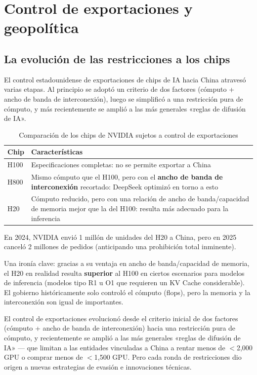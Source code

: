 \section{Control de exportaciones y geopolítica}

\subsection{La evolución de las restricciones a los chips}

El control estadounidense de exportaciones de chips de IA hacia China atravesó varias etapas. Al principio se adoptó un criterio de dos factores (cómputo + ancho de banda de interconexión), luego se simplificó a una restricción pura de cómputo, y más recientemente se amplió a las más generales «reglas de difusión de IA».

\begin{table}[H]
\centering
\begin{tabular}{lp{8cm}}
\toprule
\textbf{Chip} & \textbf{Características} \\
\midrule
H100 & Especificaciones completas: no se permite exportar a China \\
H800 & Mismo cómputo que el H100, pero con el \textbf{ancho de banda de interconexión} recortado: DeepSeek optimizó en torno a esto \\
H20 & Cómputo reducido, pero con una relación de ancho de banda/capacidad de memoria mejor que la del H100: resulta más adecuado para la inferencia \\
\bottomrule
\end{tabular}
\caption{Comparación de los chips de NVIDIA sujetos a control de exportaciones}
\end{table}

En 2024, NVIDIA envió 1 millón de unidades del H20 a China, pero en 2025 canceló 2 millones de pedidos (anticipando una prohibición total inminente).

Una ironía clave: gracias a su ventaja en ancho de banda/capacidad de memoria, el H20 en realidad resulta \textbf{superior} al H100 en ciertos escenarios para modelos de inferencia (modelos tipo R1 u O1 que requieren un KV Cache considerable). El gobierno históricamente solo controló el cómputo (flops), pero la memoria y la interconexión son igual de importantes.

El control de exportaciones evolucionó desde el criterio inicial de dos factores (cómputo + ancho de banda de interconexión) hacia una restricción pura de cómputo, y recientemente se amplió a las más generales «reglas de difusión de IA» — que limitan a las entidades vinculadas a China a rentar menos de $<$2,000 GPU o comprar menos de $<$1,500 GPU. Pero cada ronda de restricciones dio origen a nuevas estrategias de evasión e innovaciones técnicas.

